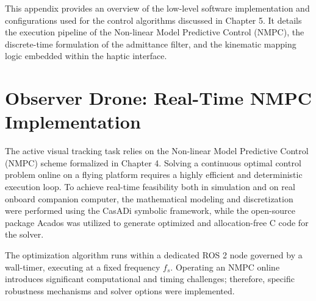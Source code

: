 \label{app:implementation_details}
This appendix provides an overview of the low-level software implementation and configurations used for the control algorithms discussed in Chapter 5. It details the execution pipeline of the Non-linear Model Predictive Control (NMPC), the discrete-time formulation of the admittance filter, and the kinematic mapping logic embedded within the haptic interface.

\section{Observer Drone: Real-Time NMPC Implementation}
The active visual tracking task relies on the Non-linear Model Predictive Control (NMPC) scheme formalized in Chapter 4. Solving a continuous optimal control problem online on a flying platform requires a highly efficient and deterministic execution loop. To achieve real-time feasibility both in simulation and on real onboard companion computer, the mathematical modeling and discretization were performed using the CasADi symbolic framework, while the open-source package Acados was utilized to generate optimized and allocation-free C code for the solver. 

\noindent The optimization algorithm runs within a dedicated ROS 2 node governed by a wall-timer, executing at a fixed frequency $f_s$. Operating an NMPC online introduces significant computational and timing challenges; therefore, specific robustness mechanisms and solver options were implemented.

